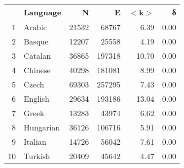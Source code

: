 \begin{tabular}{rlrrrr}
  \hline
 & Language & N & E & $<$k$>$ & δ \\ 
  \hline
1 & Arabic & 21532 & 68767 & 6.39 & 0.00 \\ 
  2 & Basque & 12207 & 25558 & 4.19 & 0.00 \\ 
  3 & Catalan & 36865 & 197318 & 10.70 & 0.00 \\ 
  4 & Chinese & 40298 & 181081 & 8.99 & 0.00 \\ 
  5 & Czech & 69303 & 257295 & 7.43 & 0.00 \\ 
  6 & English & 29634 & 193186 & 13.04 & 0.00 \\ 
  7 & Greek & 13283 & 43974 & 6.62 & 0.00 \\ 
  8 & Hungarian & 36126 & 106716 & 5.91 & 0.00 \\ 
  9 & Italian & 14726 & 56042 & 7.61 & 0.00 \\ 
  10 & Turkish & 20409 & 45642 & 4.47 & 0.00 \\ 
   \hline
\end{tabular}
